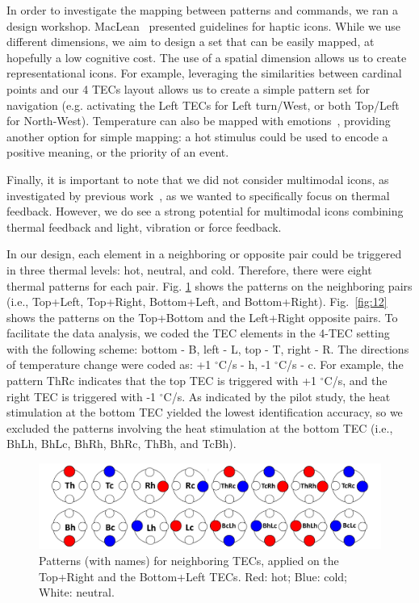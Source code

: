 \documentclass[preprint,12pt]{elsarticle}
\begin{document}
In order to investigate the mapping between patterns and commands, we ran a design workshop. MacLean~\cite{MacLean2008} presented guidelines for haptic icons. While we use different dimensions, we aim to design a set that can be easily mapped, at hopefully a low cognitive cost.
The use of a spatial dimension allows us to create representational icons. For example, leveraging the similarities between cardinal points and our 4 TECs layout allows us to create a simple pattern set for navigation (e.g. activating the Left TECs for Left turn/West, or both Top/Left for North-West). Temperature can also be mapped with emotions~\cite{35,37}, providing another option for simple mapping: a hot stimulus could be used to encode a positive meaning, or the priority of an event.

Finally, it is important to note that we did not consider multimodal icons, as investigated by previous work~\cite{Chan2008}, as we wanted to specifically focus on thermal feedback. However, we do see a strong potential for multimodal icons combining thermal feedback and light, vibration or force feedback.


In our design, each element in a neighboring or opposite pair could be triggered in three thermal levels: hot, neutral, and cold. Therefore, there were eight thermal patterns for each pair. Fig. \ref{fig:9} shows the  patterns on the neighboring pairs (i.e., Top+Left, Top+Right, Bottom+Left, and Bottom+Right). Fig.~\ref{fig:12} shows the patterns on the Top+Bottom and the Left+Right opposite pairs. To facilitate the data analysis, we coded the TEC elements in the 4-TEC setting with the following scheme: bottom - B, left - L, top - T, right - R. The directions of temperature change were coded as: +1 $^{\circ}$C/s - h, -1 $^{\circ}$C/s - c. For example, the pattern ThRc indicates that the top TEC is triggered with +1 $^{\circ}$C/s, and the right TEC is triggered with -1 $^{\circ}$C/s. As indicated by the pilot study, the heat stimulation at the bottom TEC yielded the lowest identification accuracy, so we excluded the patterns involving the heat stimulation at the bottom TEC (i.e., BhLh, BhLc, BhRh, BhRc, ThBh, and TcBh).


\begin{figure}[tp]
  \centering
  \includegraphics[width=0.9\columnwidth]{img/fig9.pdf}
  \caption{Patterns (with names) for neighboring TECs, applied on the Top+Right and the Bottom+Left TECs. Red: hot; Blue: cold; White: neutral.}
  \label{fig:9}
\end{figure}
\end{document}
